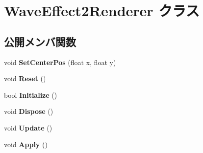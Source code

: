 \hypertarget{class_wave_effect2_renderer}{}\section{Wave\+Effect2\+Renderer クラス}
\label{class_wave_effect2_renderer}
\subsection*{公開メンバ関数}
\begin{DoxyCompactItemize}
\item 
void {\bfseries Set\+Center\+Pos} (float x, float y)\hypertarget{class_wave_effect2_renderer_a3a71761a0c5954b591d31a5731344206}{}\label{class_wave_effect2_renderer_a3a71761a0c5954b591d31a5731344206}

\item 
void {\bfseries Reset} ()\hypertarget{class_wave_effect2_renderer_ab210e46ea76e71864c808f51408a8781}{}\label{class_wave_effect2_renderer_ab210e46ea76e71864c808f51408a8781}

\item 
bool {\bfseries Initialize} ()\hypertarget{class_wave_effect2_renderer_ae15d9cf4d8faf622af7f0d8c13afda22}{}\label{class_wave_effect2_renderer_ae15d9cf4d8faf622af7f0d8c13afda22}

\item 
void {\bfseries Dispose} ()\hypertarget{class_wave_effect2_renderer_a70ac89d8444adf3a4739e2bd597ce5de}{}\label{class_wave_effect2_renderer_a70ac89d8444adf3a4739e2bd597ce5de}

\item 
void {\bfseries Update} ()\hypertarget{class_wave_effect2_renderer_a3715b2b0c6bcdfbea4d17961aee34d1f}{}\label{class_wave_effect2_renderer_a3715b2b0c6bcdfbea4d17961aee34d1f}

\item 
void {\bfseries Apply} ()\hypertarget{class_wave_effect2_renderer_aaa9af94ee95146bc6398012f30304d80}{}\label{class_wave_effect2_renderer_aaa9af94ee95146bc6398012f30304d80}

\end{DoxyCompactItemize}
